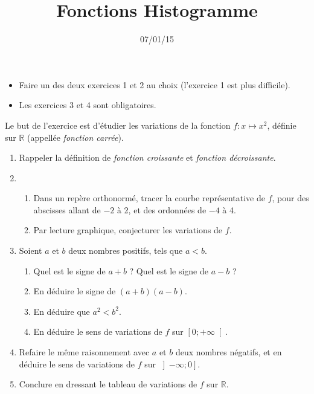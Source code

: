 \documentclass[12pt]{article}
\title{Fonctions Histogramme}
\date{07/01/15}
\begin{document}
\maketitle

\begin{itemize}
  \item Faire un des deux exercices 1 et 2 au choix (l'exercice 1 est plus difficile).
  \item Les exercices 3 et 4 sont obligatoires.
\end{itemize}

\begin{exercice}
  Le but de l'exercice est d'étudier les variations de la fonction $f:x\mapsto x^2$, définie sur $\mathbb{R}$ (appellée \emph{fonction carrée}).

  \begin{enumerate}
    \item Rappeler la définition de \emph{fonction croissante} et \emph{fonction décroissante}.
    \item 
      \begin{enumerate}
        \item Dans un repère orthonormé, tracer la courbe représentative de $f$, pour des abscisses allant de $-2$ à 2, et des ordonnées de $-4$ à 4.
        \item Par lecture graphique, conjecturer les variations de $f$.
      \end{enumerate}
    \item Soient $a$ et $b$ deux nombres positifs, tels que $a<b$.
      \begin{enumerate}
        \item Quel est le signe de $a+b$ ? Quel est le signe de $a-b$ ?
        \item En déduire le signe de $\left( a+b \right)\left( a-b \right)$.
        \item En déduire que $a^2<b^2$.
        \item En déduire le sens de variations de $f$ sur $\left[ 0; +\infty \right[$.
        \end{enumerate}
    \item Refaire le même raisonnement avec $a$ et $b$ deux nombres négatifs, et en déduire le sens de variations de $f$ sur $\left] -\infty;0 \right]$.
    \item Conclure en dressant le tableau de variations de $f$ sur $\mathbb{R}$.

  \end{enumerate}

\end{exercice}
\end{document}
